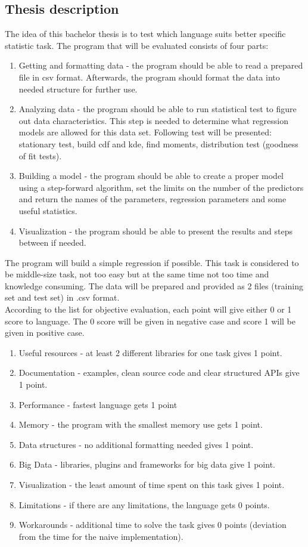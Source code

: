 \documentclass{article}
\begin{document}
\subsection{Thesis description}
The idea of this bachelor thesis is to test which language suits better specific statistic task. 
The program that will be evaluated consists of four parts:
\begin{enumerate}
    \item Getting and formatting data - the program should be able to read a prepared file in csv format. Afterwards, the program should format the data into needed structure for further use.
    \item Analyzing data - the program should be able to run statistical test to figure out data characteristics. This step is needed to determine what regression models are allowed for this data set. Following test will be presented: stationary test, build cdf and kde, find moments, distribution test (goodness of fit tests).
    \item Building a model - the program should be able to create a proper model using a step-forward algorithm, set the limits on the number of the predictors and return the names of the parameters, regression parameters and some useful statistics.
    \item Visualization - the program should be able to present the results and steps between if needed.
\end{enumerate}
The program will build a simple regression if possible. This task is considered to be middle-size task, not too easy but at the same time not too time and knowledge consuming.
The data will be prepared and provided as 2 files (training set and test set) in .csv format.\\
According to the list for objective evaluation, each point will give either 0 or 1 score to language. The 0 score will be given in negative case and score 1 will be given in positive case.
\begin{enumerate}
    \item[] Useful resources - at least 2 different libraries for one task gives 1 point.
    \item[] Documentation - examples, clean source code and clear structured APIs give 1 point.
    \item[] Performance - fastest language gets 1 point
    \item[] Memory - the program with the smallest memory use gets 1 point.
    \item[] Data structures - no additional formatting needed gives 1 point.
    \item[] Big Data - libraries, plugins and frameworks for big data give 1 point.
    \item[] Visualization - the least amount of time spent on this task gives 1 point.
    \item[] Limitations - if there are any limitations, the language gets 0 points.
    \item[] Workarounds - additional time to solve the task gives 0 points (deviation from the time for the naive implementation).
\end{enumerate}
\end{document}
